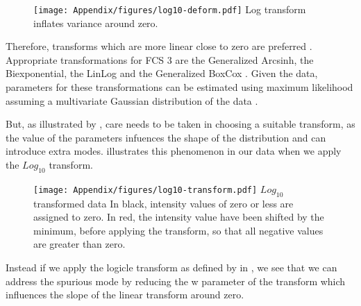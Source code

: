 \begin{figure}
\centering
\texttt{[image: Appendix/figures/log10-deform.pdf]}
{Log transform inflates variance around zero.}
{
}
\end{figure}

Therefore, transforms which are more linear close to zero are preferred \citep{Durbin:2002tj,Tung:2006uw}.
Appropriate transformations for FCS 3 are the Generalized Arcsinh, the Biexponential, the LinLog and the Generalized BoxCox
\citep{Bagwell:2005he,Parks:2006gaa,Finak:2010is}.
Given the data, parameters for these transformations can be estimated using maximum likelihood assuming a multivariate Gaussian distribution of the data \citep{Finak:2010is}. 

But, as illustrated by \citet{Tung:2006uw}, care needs to be taken in choosing a suitable transform, as the value of the parameters
infuences the shape of the distribution and can introduce extra modes.
 illustrates this phenomenon in our data when we apply the $Log_{10}$ transform.

\begin{figure}[h]
\centering
\texttt{[image: Appendix/figures/log10-transform.pdf]}
{$Log_{10}$ transformed data}
{
  In black, intensity values of zero or less are assigned to zero.
  In red, the intensity value have been shifted by the minimum, before applying the transform, so that all negative values are greater than zero.
}
\end{figure}

Instead if we apply the logicle transform as defined by \citet{Parks:2006gaa} in ,
we see that we can address the spurious mode by reducing the w parameter of the transform which influences the slope of the linear transform around zero.


